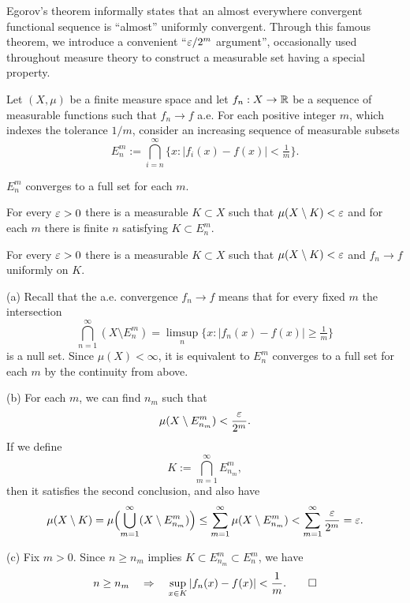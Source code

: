 \documentclass{../../large}
\begin{document}
\begin{prb}
Egorov's theorem informally states that an almost everywhere convergent functional sequence is ``almost'' uniformly convergent.
Through this famous theorem, we introduce a convenient ``$\varepsilon/2^m$ argument'', occasionally used throughout measure theory to construct a measurable set having a special property.

Let $(X,\mu)$ be a finite measure space and let $f_n:X\to\mathbb{R}$ be a sequence of measurable functions such that $f_n\to f$ a.e.
For each positive integer $m$, which indexes the tolerance $1/m$, consider an increasing sequence of measurable subsets
\[E_n^m:=\bigcap_{i=n}^\infty\{x:|f_i(x)-f(x)|<\tfrac1m\}.\]
\begin{parts}
\item $E_n^m$ converges to a full set for each $m$.
\item For every $\varepsilon>0$ there is a measurable $K\subset X$ such that $\mu(X\setminus K)<\varepsilon$ and for each $m$ there is finite $n$ satisfying $K\subset E_n^m$.
\item For every $\varepsilon>0$ there is a measurable $K\subset X$ such that $\mu(X\setminus K)<\varepsilon$ and $f_n\to f$ uniformly on $K$.
\end{parts}
\end{prb}
\begin{pf}
(a)
Recall that the a.e. convergence $f_n\to f$ means that for every fixed $m$ the intersection
\[\bigcap_{n=1}^\infty(X\setminus E_n^m)=\limsup_n\{x:|f_n(x)-f(x)|\ge\tfrac1m\}\]
is a null set.
Since $\mu(X)<\infty$, it is equivalent to $E_n^m$ converges to a full set for each $m$ by the continuity from above.

(b)
For each $m$, we can find $n_m$ such that
\[\mu(X\setminus E_{n_m}^m)<\frac{\varepsilon}{2^m}.\]
If we define
\[K:=\bigcap_{m=1}^\infty E_{n_m}^m,\]
then it satisfies the second conclusion, and also have
\[\mu(X\setminus K)=\mu\Bigl(\bigcup_{m=1}^\infty(X\setminus E_{n_m}^m)\Bigr)\le\sum_{m=1}^\infty\mu(X\setminus E_{n_m}^m)<\sum_{m=1}^\infty\frac{\varepsilon}{2^m}=\varepsilon.\]


(c)
Fix $m>0$.
Since $n\ge n_m$ implies $K\subset E_{n_m}^m\subset E_n^m$, we have
\[n\ge n_m\quad\Rightarrow\quad\sup_{x\in K}|f_n(x)-f(x)|<\frac1m.\qedhere\]
\end{pf}
\end{document}
